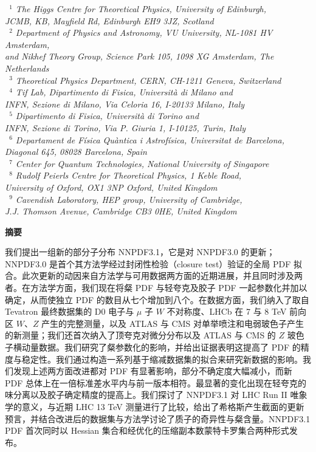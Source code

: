 \documentclass[11pt]{ctexart}
\numberwithin{equation}{section}
\numberwithin{figure}{section}
\numberwithin{table}{section}
\begin{document}
\begin{center}
\vspace{0.5cm}
{\it \small ~$^1$ The Higgs Centre for Theoretical Physics, University of Edinburgh,\\
  JCMB, KB, Mayfield Rd, Edinburgh EH9 3JZ, Scotland\\
~$^2$ Department of Physics and Astronomy, VU University, NL-1081 HV Amsterdam,\\
and Nikhef Theory Group, Science Park 105, 1098 XG Amsterdam, The Netherlands\\
  ~$^3$ Theoretical Physics Department, CERN, CH-1211 Geneva, Switzerland\\
~$^4$ Tif Lab, Dipartimento di Fisica, Universit\`a di Milano and\\
INFN, Sezione di Milano, Via Celoria 16, I-20133 Milano, Italy\\
~$^5$ Dipartimento di Fisica, Universit\`a
di Torino and\\ INFN, Sezione di Torino,
Via P. Giuria 1, I-10125, Turin, Italy\\
~$^6$
Departament de F\'isica Qu\`antica i Astrof\'isica, Universitat de Barcelona,\\ Diagonal 645, 08028 Barcelona, Spain\\
~$^7$ Center for Quantum Technologies, National University of Singapore\\
  ~$^8$ Rudolf Peierls Centre for Theoretical Physics, 1 Keble
Road,\\ University of Oxford, OX1 3NP Oxford, United Kingdom\\
~$^9$ Cavendish Laboratory, HEP group,
University of Cambridge,\\ J.J. Thomson Avenue,
Cambridge CB3 0HE, United Kingdom
}
\end{center}

{\bf \large 摘要}

\vspace{0.2cm}
我们提出一组新的部分子分布 NNPDF3.1，它是对 NNPDF3.0 的更新；NNPDF3.0 是首个其方法学经过封闭性检验（closure test）验证的全局 PDF 拟合。此次更新的动因来自方法学与可用数据两方面的近期进展，并且同时涉及两者。在方法学方面，我们现在将粲 PDF 与轻夸克及胶子 PDF 一起参数化并加以确定，从而使独立 PDF 的数目从七个增加到八个。在数据方面，我们纳入了取自 Tevatron 最终数据集的 D0 电子与 $\mu$ 子 $W$ 不对称度、LHCb 在 7 与 8 TeV 前向区 $W$、$Z$ 产生的完整测量，以及 ATLAS 与 CMS 对单举喷注和电弱玻色子产生的新测量；我们还首次纳入了顶夸克对微分分布以及 ATLAS 与 CMS 的 $Z$ 玻色子横动量数据。我们研究了粲参数化的影响，并给出证据表明这提高了 PDF 的精度与稳定性。我们通过构造一系列基于缩减数据集的拟合来研究新数据的影响。我们发现上述两方面改进都对 PDF 有显著影响，部分不确定度大幅减小，而新 PDF 总体上在一倍标准差水平内与前一版本相符。最显著的变化出现在轻夸克的味分离以及胶子确定精度的提高上。我们探讨了 NNPDF3.1 对 LHC Run II 唯象学的意义，与近期 LHC 13 TeV 测量进行了比较，给出了希格斯产生截面的更新预言，并结合改进后的数据集与方法学讨论了质子的奇异性与粲含量。NNPDF3.1 PDF 首次同时以 Hessian 集合和经优化的压缩副本数蒙特卡罗集合两种形式发布。
\end{document}
